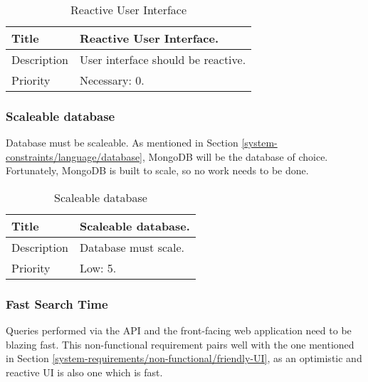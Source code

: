   \begin{table}[h!]
    \caption{Reactive User Interface}
    \label{system-requirements/non-functional/reactive-UI-table}
    \begin{tabularx}{\textwidth}{|l|X|}
      \hline
      Title           & Reactive User Interface. \\ \hline
      Description     & User interface should be reactive.\\ \hline
      Priority        & Necessary: 0. \\ \hline
    \end{tabularx}
  \end{table}

\subsubsection{Scaleable database}
  Database must be scaleable. As mentioned in Section
  \ref{system-constraints/language/database}, MongoDB will be the database of
  choice. Fortunately, MongoDB is built to scale, so no work needs to be done.

  \begin{table}[h!]
    \caption{Scaleable database}
    \label{system-requirements/non-functional/scaleable-database-table}
    \begin{tabularx}{\textwidth}{|l|X|}
      \hline
      Title           & Scaleable database. \\ \hline
      Description     & Database must scale.\\ \hline
      Priority        & Low: 5. \\ \hline
    \end{tabularx}
  \end{table}

\subsubsection{Fast Search Time}
  Queries performed via the API and the front-facing web application need to be
  blazing fast. This non-functional requirement pairs well with the one
  mentioned in Section \ref{system-requirements/non-functional/friendly-UI}, as
  an optimistic and reactive UI is also one which is fast.

